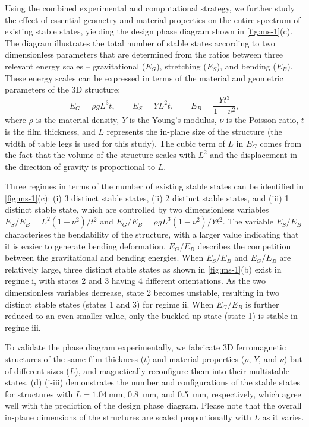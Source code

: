 Using the combined experimental and computational strategy, we further study the effect of essential geometry and material properties on the entire spectrum of existing stable states, yielding the design phase diagram shown in \cref{fig:ms-1}(c).
The diagram illustrates the total number of stable states according to two dimensionless parameters that are determined from the ratios between three relevant energy scales – gravitational ($E_G$), stretching ($E_S$), and bending ($E_B$).
These energy scales can be expressed in terms of the material and geometric parameters of the 3D structure:
\begin{equation}
  E_G = \rho g L^3 t, \qquad E_S = Y L^2 t, \qquad E_B = \frac{Yt^3}{1-\nu^2},
\end{equation}
where $\rho$ is the material density, $Y$ is the Young’s modulus, $\nu$ is the Poisson ratio, $t$ is the film thickness, and $L$ represents the in-plane size of the structure (the width of table legs is used for this study).
The cubic term of $L$ in $E_G$ comes from the fact that the volume of the structure scales with $L^2$ and the displacement in the direction of gravity is proportional to $L$.

Three regimes in terms of the number of existing stable states can be identified in \cref{fig:ms-1}(c): (i) 3 distinct stable states, (ii) 2 distinct stable states, and (iii) 1 distinct stable state, which are controlled by two dimensionless variables $E_S/E_B = L^2(1-\nu^2)/t^2$ and $E_G/E_B = \rho g L^3 (1-\nu^2) / Yt^2$.
The variable $E_S/E_B$ characterises the bendability of the structure, with a larger value indicating that it is easier to generate bending deformation.
$E_G/E_B$ describes the competition between the gravitational and bending energies.
When $E_S/E_B$ and $E_G/E_B$ are relatively large, three distinct stable states as shown in \cref{fig:ms-1}(b) exist in regime i, with states 2 and 3 having 4 different orientations.
As the two dimensionless variables decrease, state 2 becomes unstable, resulting in two distinct stable states (states 1 and 3) for regime ii.
When $E_G/E_B$ is further reduced to an even smaller value, only the buckled-up state (state 1) is stable in regime iii.

To validate the phase diagram experimentally, we fabricate 3D ferromagnetic structures of the same film thickness ($t$) and material properties ($\rho$, $Y$, and $\nu$) but of different sizes ($L$), and magnetically reconfigure them into their multistable states.
(d) (i-iii) demonstrates the number and configurations of the stable states for structures with $L = \SI{1.04}{\milli\meter}$, \SI{0.8}{\milli\meter}, and \SI{0.5}{\milli\meter}, respectively, which agree well with the prediction of the design phase diagram.
Please note that the overall in-plane dimensions of the structures are scaled proportionally with $L$ as it varies.

